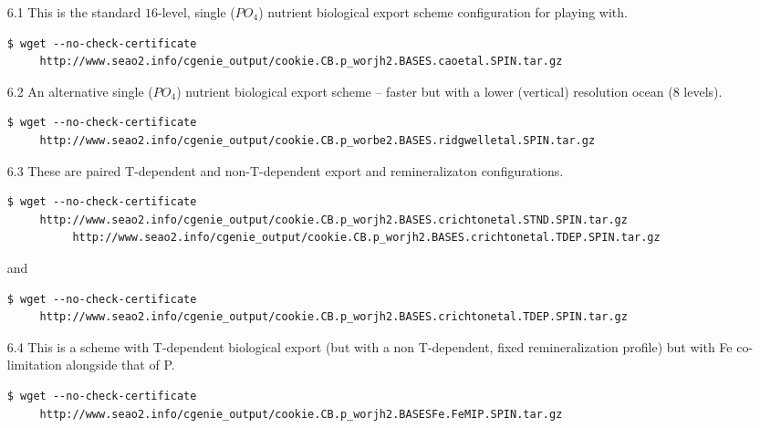 \begin{itemize}[noitemsep]
\vspace{2mm}
\item [6.1] This is the standard $16$-level, single (\(PO_{4}\)) nutrient biological export scheme configuration for playing with.
\vspace{-1mm}\footnotesize\begin{verbatim}
$ wget --no-check-certificate 
     http://www.seao2.info/cgenie_output/cookie.CB.p_worjh2.BASES.caoetal.SPIN.tar.gz
\end{verbatim}\normalsize\vspace{-1mm}
\vspace{2mm}
\item [6.2] An alternative single (\(PO_{4}\)) nutrient biological export scheme -- faster but with a lower (vertical) resolution ocean ($8$ levels).
\vspace{-1mm}\footnotesize\begin{verbatim}
$ wget --no-check-certificate 
     http://www.seao2.info/cgenie_output/cookie.CB.p_worbe2.BASES.ridgwelletal.SPIN.tar.gz
\end{verbatim}\normalsize\vspace{-1mm}
\vspace{2mm}
\item [6.3] These are paired T-dependent and non-T-dependent export and remineralizaton configurations.
\vspace{-1mm}\footnotesize \begin{verbatim}
$ wget --no-check-certificate 
     http://www.seao2.info/cgenie_output/cookie.CB.p_worjh2.BASES.crichtonetal.STND.SPIN.tar.gz
          http://www.seao2.info/cgenie_output/cookie.CB.p_worjh2.BASES.crichtonetal.TDEP.SPIN.tar.gz
\end{verbatim} \normalsize
and
\vspace{-1mm}\footnotesize\begin{verbatim}
$ wget --no-check-certificate 
     http://www.seao2.info/cgenie_output/cookie.CB.p_worjh2.BASES.crichtonetal.TDEP.SPIN.tar.gz
\end{verbatim} \normalsize
\vspace{2mm}
\item [6.4] This is a scheme with T-dependent biological export (but with a non T-dependent, fixed remineralization profile) but with Fe co-limitation alongside that of P.
\vspace{-1mm}\footnotesize\begin{verbatim}
$ wget --no-check-certificate 
     http://www.seao2.info/cgenie_output/cookie.CB.p_worjh2.BASESFe.FeMIP.SPIN.tar.gz
\end{verbatim}\normalsize
\end{itemize}

